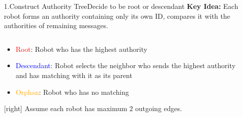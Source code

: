 \begin{frame}{1.Construct Authority Tree}{Decide to be root or descendant}
  \textbf{Key Idea:} Each robot forms an authority containing only its
  own ID, compares it with the authorities of remaining messages.
  \begin{columns}[T] %
    \begin{column}{.45\textwidth}
      \begin{itemize}
      \item {\textcolor{red}{Root}: Robot who has the highest authority}
      \item {\textcolor{blue}{Descendant}: Robot selects the neighbor who sends
          the highest authority and has matching with it as its parent}
      \item {\textcolor{orange}{Orphan}: Robot who has no matching}
      \end{itemize}  
      \footnotesize{[right] Assume each robot has maximum $2$ outgoing
        edges.}
    \end{column}%
    \begin{column}{.5\textwidth}
       
    \end{column}
  \end{columns}
\end{frame}